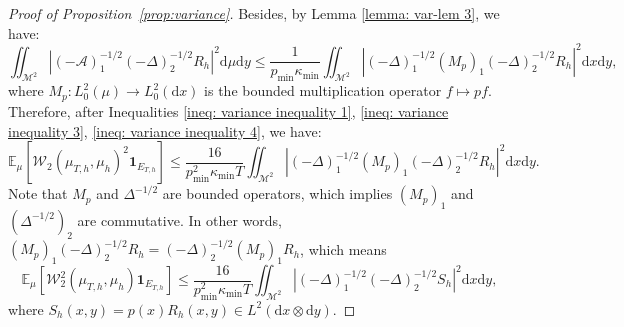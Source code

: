 \documentclass[10pt,a4paper]{article}
\newcommand{\E}{{\mathbb E}}
\newcommand{\ind}{{\mathbf 1}}
\newcommand\cA{\mathcal{A}}
\newcommand\cM{\mathcal{M}}
\newcommand\W{\mathcal{W}}
\newcommand\dd{\mathrm{d}}
\newcommand{\ABS}[1]{{{\left| #1 \right|}}} %
\newcommand{\PAR}[1]{{{\left(#1\right)}}} %
\newcommand{\SBRA}[1]{{{\left[#1\right]}}} %
\begin{document}
\begin{proof}[Proof of Proposition~\ref{prop:variance}]
Besides, by Lemma \ref{lemma: var-lem 3}, we have:
	\begin{equation} \label{ineq:  variance inequality 4}
\iint_{\cM^2}\ABS{\PAR{-\cA}_1^{-1/2}\PAR{-\Delta}_2^{-1/2} R_h }^2\dd\mu\dd y \le  \frac{1}{p_{\min}\kappa_{\min}} \iint_{\cM^2}\ABS{\PAR{-\Delta}_1^{-1/2}(M_p)_1\PAR{-\Delta}_2^{-1/2} R_h }^2\dd x \dd y,
\end{equation}
	where $M_p: L^2_0(\mu) \rightarrow L^2_0(\dd x)$ is the bounded multiplication operator $f \mapsto pf$. 
\\	
Therefore, after Inequalities \eqref{ineq:  variance inequality 1},	\eqref{ineq:  variance inequality 3}, \eqref{ineq:  variance inequality 4}, we have:
$$ \E_{\mu}\SBRA{\W_2( \mu_{T,h} ,\mu_h )^2\ind_{E_{T,h}}} \le \frac{{16}}{p_{\min}^2\kappa_{\min}T}\iint_{\cM^2}\ABS{\PAR{-\Delta}_1^{-1/2}(M_p)_1\PAR{-\Delta}_2^{-1/2} R_h }^2\dd x\dd y.$$
Note that $M_p$ and $\Delta^{-1/2}$ are bounded operators, which implies $(M_p)_1$ and $(\Delta^{-1/2})_2$ are commutative. In other words, $ (M_p)_1\PAR{-\Delta}_2^{-1/2} R_h=  \PAR{-\Delta}_2^{-1/2}(M_p)_1 R_h$, which means
 \[
     \E_{\mu}\SBRA{\W_2^2( \mu_{T,h} ,\mu_h )\ind_{E_{T,h}}} \le
  \frac{{16}}{p_{\min}^2\kappa_{\min}T }  \iint_{\cM^2}\ABS{\PAR{-\Delta}_1^{-1/2}\PAR{-\Delta}_2^{-1/2} S_h }^2\dd x  \dd y,
 \] 
 where $S_h(x,y)= p(x) R_h(x,y)  \in L^2( \dd x \otimes \dd y)$.
 

\end{proof}
\end{document}
